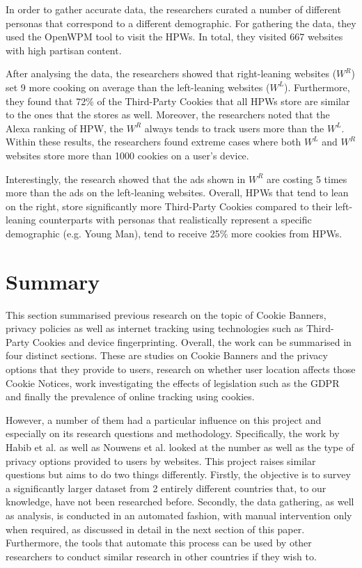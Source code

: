 \documentclass[../main.tex]{subfiles}
\begin{document}
In order to gather accurate data, the researchers curated a number of different personas that correspond to a different demographic. For gathering the data, they used the OpenWPM tool to visit the HPWs. In total, they visited 667 websites with high partisan content. 

After analysing the data, the researchers showed that right-leaning websites ($W^R$) set 9 more cooking on average than the left-leaning websites ($W^L$). Furthermore, they found that 72\% of the Third-Party Cookies that all HPWs store are similar to the ones that the  stores as well. Moreover, the researchers noted that the Alexa ranking of HPW, the $W^R$ always tends to track users more than the $W^L$. Within these results, the researchers found extreme cases where both $W^L$ and $W^R$ websites store more than 1000 cookies on a user’s device. 

Interestingly, the research showed that the ads shown in $W^R$ are costing 5 times more than the ads on the left-leaning websites. Overall, HPWs that tend to lean on the right, store significantly more Third-Party Cookies compared to their left-leaning counterparts with personas that realistically represent a specific demographic (e.g. Young Man), tend to receive 25\% more cookies from HPWs.

\section{Summary}
This section summarised previous research on the topic of Cookie Banners, privacy policies as well as internet tracking using technologies such as Third-Party Cookies and device fingerprinting. Overall, the work can be summarised in four distinct sections. These are studies on Cookie Banners and the privacy options that they provide to users, research on whether user location affects those Cookie Notices, work investigating the effects of legislation such as the GDPR and finally the prevalence of online tracking using cookies. 

However, a number of them had a particular influence on this project and especially on its research questions and methodology. Specifically, the work by Habib et al. as well as Nouwens et al. looked at the number as well as the type of privacy options provided to users by websites. This project raises similar questions but aims to do two things differently. Firstly, the objective is to survey a significantly larger dataset from 2 entirely different countries that, to our knowledge, have not been researched before. Secondly, the data gathering, as well as analysis, is conducted in an automated fashion, with manual intervention only when required, as discussed in detail in the next section of this paper. Furthermore, the tools that automate this process can be used by other researchers to conduct similar research in other countries if they wish to.
\end{document}
